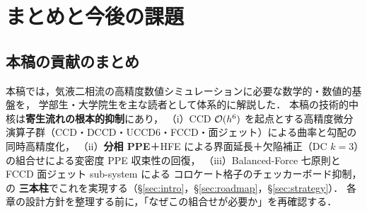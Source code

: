 \section{まとめと今後の課題}
\label{sec:conclusion}

\subsection{本稿の貢献のまとめ}
\label{sec:contribution_summary}

本稿では，気液二相流の高精度数値シミュレーションに必要な数学的・数値的基盤を，
学部生・大学院生を主な読者として体系的に解説した．
本稿の技術的中核は\textbf{寄生流れの根本的抑制}にあり，
（i）CCD $\mathcal{O}(h^6)$ を起点とする高精度微分演算子群（CCD・DCCD・UCCD6・FCCD・面ジェット）による曲率と勾配の同時高精度化，
（ii）\textbf{分相 PPE}＋HFE による界面延長＋欠陥補正（DC $k=3$）の組合せによる変密度 PPE 収束性の回復，
（iii）Balanced-Force 七原則と FCCD 面ジェット sub-system による
コロケート格子のチェッカーボード抑制，
の \textbf{三本柱}でこれを実現する（§\ref{sec:intro}，§\ref{sec:roadmap}，§\ref{sec:strategy}）．
各章の設計方針を整理する前に，「なぜこの組合せが必要か」を再確認する．

